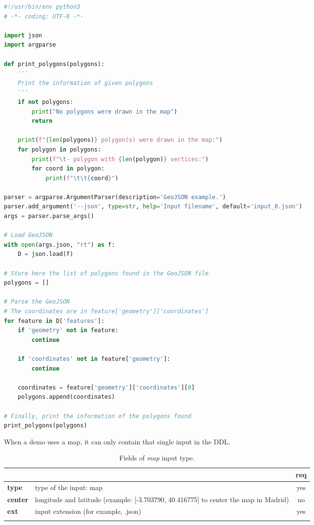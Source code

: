 \begin{lstlisting}[language=python,firstnumber=1]
#!/usr/bin/env python3
# -*- coding: UTF-8 -*-

import json
import argparse

def print_polygons(polygons):
    '''
    Print the information of given polygons
    '''
    if not polygons:
        print("No polygons were drawn in the map")
        return
    
    print(f"{len(polygons)} polygon(s) were drawn in the map:")
    for polygon in polygons:
        print(f"\t- polygon with {len(polygon)} vertices:")
        for coord in polygon:
            print(f"\t\t{coord}")

parser = argparse.ArgumentParser(description='GeoJSON example.')
parser.add_argument('--json', type=str, help='Input filename', default='input_0.json')
args = parser.parse_args()

# Load GeoJSON
with open(args.json, "rt") as f:
    D = json.load(f)

# Store here the list of polygons found in the GeoJSON file
polygons = []

# Parse the GeoJSON
# The coordinates are in feature['geometry']['coordinates']
for feature in D['features']:
    if 'geometry' not in feature:
        continue
    
    if 'coordinates' not in feature['geometry']:
        continue
    
    coordinates = feature['geometry']['coordinates'][0]
    polygons.append(coordinates)

# Finally, print the information of the polygons found
print_polygons(polygons)
\end{lstlisting}

When a demo uses a map, it can only contain that single input in the DDL.

\begin{longtable}{|>{\bf}L{\linewidth}|L{\linewidth}|c|}
\hline
{}     &  & {\bf req} \tabularnewline 
\hline \hline
 type         & type of the input: map & yes \\ \hline
 center         & longitude and latitude (example: [-3.703790, 40.416775] to center the map in Madrid) & no \\ \hline
 ext          & input extension (for example, .json) & yes \\ \hline
\caption{Fields of \emph{map} input type.}
\end{longtable}



